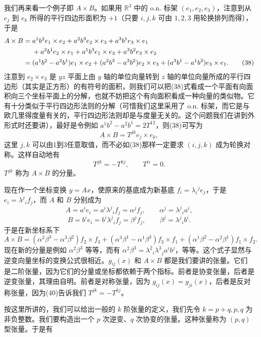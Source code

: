 我们再来看一个例子即 $A\times B$。如果用 $\mathbb R^3$ 中的 o.n. 标架 $(e_1,e_2,e_3)$，注意到从 $e_j$ 到 $e_k$ 所得的平行四边形面积为 $+1$（只要 $i,j,k$ 可由 $1,2,3$ 用轮换排列而得），于是
\begin{align}
 A\times B={}&a^1b^2 e_1\times e_2+a^2b^3e_2\times e_3+a^3b^1e_3\times e_1\notag\\
 &+a^2b^1e_2\times e_1+a^1b^3e_1\times e_3+a^3b^2e_3\times e_2\notag\\
 ={}&(a^1b^2-a^2b^1)e_1\times e_2+(a^2b^3-a^3b^2)e_2\times e_3
 +(a^3b^1-a^1b^3)e_3\times e_1.
 \tag{38}
\end{align}
注意到 $e_2\times e_3$ 是 $yz$ 平面上由 $y$ 轴的单位向量转到 $z$ 轴的单位向量所成的平行四边形（其实是正方形）的有符号的面积，则我们可以把(38)式看成一个平面有向面积向三个坐标平面上的分解，也就不妨把这个有向面积看成一种向量的类似物。它有十分类似于平行四边形法则的分解（可惜我们这里采用了 o.n. 标架，而它是与欧几里得度量有关的，平行四边形法则却是与度量无关的。这个问题我们在讲到外形式时还要讲），最好是令例如 $a^1b^2-a^2b^1=2T^{12}$，则(38)可写为
\begin{equation}
 A\times B=T^{jk}e_j\times e_k,
 \tag{39}
\end{equation}
这里 $j,k$ 可以由1到3任意取值，而不必如(38)那样一定要求 $(i,j,k)$ 成为轮换对称。这样自动地有
\begin{equation}
 T^{jk}=-T^{kj},\qquad T^{ii}=0.
 \tag{40}
\end{equation}
$T^{jk}$ 称为 $A\times B$ 的分量。

现在作一个坐标变换 $y=Ax$，使原来的基底成为新基底 $f_i=\lambda_i{}^j e_j$，于是 $e_i=\lambda^j{}_i f_j$，而 $A$ 和 $B$ 分别成为
\[
 A=a^ie_i=a^i\lambda^j{}_i f_j=\alpha^j f_j,
 \qquad \alpha^j=\lambda^j{}_i a^i,
\]
\[
 B=b^ie_i=b^i\lambda^j{}_i f_j=\beta^j f_j,
 \qquad \beta^j=\lambda^j{}_i b^i.
\]
于是在新坐标系下
\[
 A\times B=(\alpha^2\beta^3-\alpha^3\beta^2)f_2\times f_3
 +(\alpha^3\beta^1-\alpha^1\beta^3)f_3\times f_1
 +(\alpha^1\beta^2-\alpha^2\beta^1)f_1\times f_2.
\]
现在新的分量是例如 $\alpha^2\beta^3$ 等等，而有 $\alpha^2\beta^3=\lambda^2{}_i\lambda^3{}_j a^i b^j$，等等。这个式子显然与逆变向量坐标的变换公式很相近。$g_{ij}(x)$ 和 $A\times B$ 都是我们要讲的张量。它们是二阶张量，因为它们的分量或坐标都依赖于两个指标。前者是协变张量，后者是逆变张量，其理由自明。前者是对称张量，因为 $g_{ij}(x)=g_{ji}(x)$，后者是反对称张量，因为(40)告诉我们 $T^{jk}=-T^{kj}$。

按这里所讲的，我们可以给出一般的 $k$ 阶张量的定义，我们先令 $k=p+q,p,q$ 为非负整数。我们要构造出一个 $p$ 次逆变、$q$ 次协变的张量。这种张量称为 $(p,q)$ 型张量。于是有

